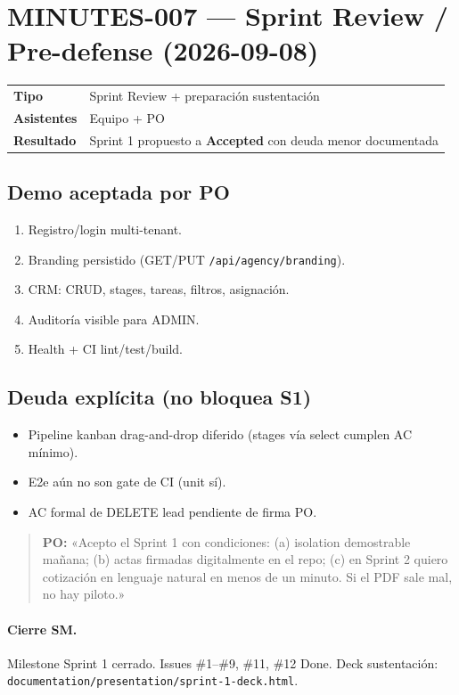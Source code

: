 \documentclass[11pt,a4paper]{article}
\begin{document}
\section{MINUTES-007 — Sprint Review / Pre-defense (2026-09-08)}
\begin{tabular}{@{}ll@{}}
\textbf{Tipo} & Sprint Review + preparación sustentación \\
\textbf{Asistentes} & Equipo + PO \\
\textbf{Resultado} & Sprint 1 propuesto a \textbf{Accepted} con deuda menor documentada \\
\end{tabular}

\subsection*{Demo aceptada por PO}
\begin{enumerate}[leftmargin=*]
  \item Registro/login multi-tenant.
  \item Branding persistido (GET/PUT \texttt{/api/agency/branding}).
  \item CRM: CRUD, stages, tareas, filtros, asignación.
  \item Auditoría visible para ADMIN.
  \item Health + CI lint/test/build.
\end{enumerate}

\subsection*{Deuda explícita (no bloquea S1)}
\begin{itemize}[leftmargin=*]
  \item Pipeline kanban drag-and-drop diferido (stages vía select cumplen AC mínimo).
  \item E2e aún no son gate de CI (unit sí).
  \item AC formal de DELETE lead pendiente de firma PO.
\end{itemize}

\begin{quote}
\textcolor{po}{\textbf{PO:} «Acepto el Sprint 1 con condiciones: (a) isolation demostrable mañana; (b) actas firmadas digitalmente en el repo; (c) en Sprint 2 quiero cotización en lenguaje natural en menos de un minuto. Si el PDF sale mal, no hay piloto.»}
\end{quote}

\paragraph{Cierre SM.} Milestone Sprint 1 cerrado. Issues \#1--\#9, \#11, \#12 Done. Deck sustentación: \texttt{documentation/presentation/sprint-1-deck.html}.
\end{document}
